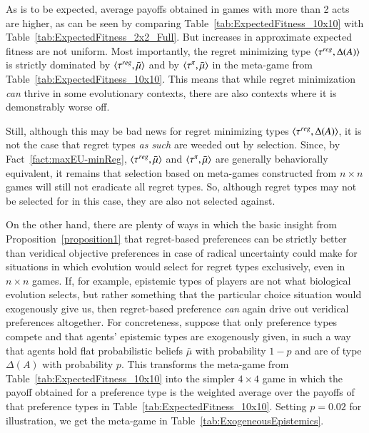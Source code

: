 \documentclass[fleqn,reqno,11pt]{article}
\begin{document}
As is to be expected, average payoffs obtained in games with more than 2 acts are higher, as
can be seen by comparing Table~\ref{tab:ExpectedFitness_10x10} with
Table~\ref{tab:ExpectedFitness_2x2_Full}. But increases in approximate expected fitness are not
uniform. Most importantly, the regret minimizing type $\left \langle \tau^{reg}, \Delta(A)\right\rangle$ is
strictly dominated by $\left \langle \tau^{reg}, \bar{\mu}\right\rangle$ and by $\left \langle \tau^{\pi}, \bar{\mu}\right\rangle$ in
the meta-game from Table~\ref{tab:ExpectedFitness_10x10}. This means that while regret
minimization \emph{can} thrive in some evolutionary contexts, there are also contexts where it
is demonstrably worse off.

Still, although this may be bad news for regret minimizing types
$\left \langle \tau^{reg}, \Delta(A)\right\rangle$, it is not the case that regret types \emph{as such} are weeded
out by selection. Since, by Fact~\ref{fact:maxEU-minReg}, $\left \langle \tau^{reg}, \bar{\mu}\right\rangle$ and
$\left \langle \tau^{\pi}, \bar{\mu}\right\rangle$ are generally behaviorally equivalent, it remains that
selection based on meta-games constructed from $n \times n$ games will still not eradicate all
regret types. So, although regret types may not be selected for in this case, they are also not
selected against.

On the other hand, there are plenty of ways in which the basic insight from
Proposition~\ref{proposition1} that regret-based preferences can be strictly better than
veridical objective preferences in case of radical uncertainty could make for situations in
which evolution would select for regret types exclusively, even in $n \times n$ games. If, for
example, epistemic types of players are not what biological evolution selects, but rather
something that the particular choice situation would exogenously give us, then regret-based
preference \emph{can} again drive out veridical preferences altogether. For concreteness,
suppose that only preference types compete and that agents' epistemic types are exogenously
given, in such a way that agents hold flat probabilistic beliefs $\bar{\mu}$ with probability
$1-p$ and are of type $\Delta(A)$ with probability $p$. This transforms the meta-game from
Table~\ref{tab:ExpectedFitness_10x10} into the simpler $4 \times 4$ game in which the payoff
obtained for a preference type is the weighted average over the payoffs of that preference
types in Table~\ref{tab:ExpectedFitness_10x10}. Setting $p = 0.02$ for illustration, we get the
meta-game in Table~\ref{tab:ExogeneousEpistemics}. 
\end{document}
